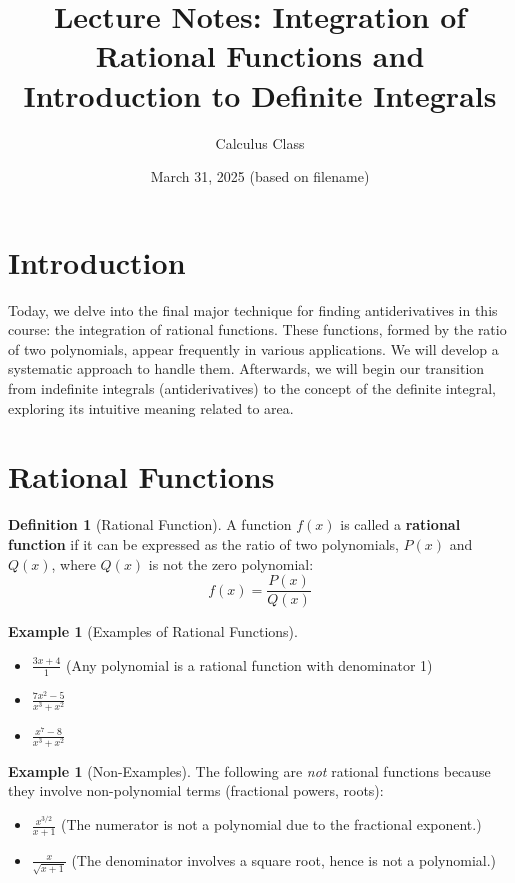 \documentclass[11pt]{article}
\title{Lecture Notes: Integration of Rational Functions and Introduction to Definite Integrals}
\author{Calculus Class}
\date{March 31, 2025 (based on filename)}
\theoremstyle{plain}
\theoremstyle{definition}
\newtheorem{definition}[theorem]{Definition}
\newtheorem{example}[theorem]{Example}
\theoremstyle{remark}
\begin{document}
\maketitle


\section{Introduction}

Today, we delve into the final major technique for finding antiderivatives in this course: the integration of rational functions. These functions, formed by the ratio of two polynomials, appear frequently in various applications. We will develop a systematic approach to handle them. Afterwards, we will begin our transition from indefinite integrals (antiderivatives) to the concept of the definite integral, exploring its intuitive meaning related to area.

\section{Rational Functions}

\begin{definition}[Rational Function]
A function $f(x)$ is called a \textbf{rational function} if it can be expressed as the ratio of two polynomials, $P(x)$ and $Q(x)$, where $Q(x)$ is not the zero polynomial:
\[ f(x) = \frac{P(x)}{Q(x)} \]
\end{definition}

\begin{example}[Examples of Rational Functions]
\begin{itemize}
    \item $\frac{3x + 4}{1}$ (Any polynomial is a rational function with denominator 1)
    \item $\frac{7x^2 - 5}{x^3 + x^2}$
    \item $\frac{x^7 - 8}{x^3 + x^2}$
\end{itemize}
\end{example}

\begin{example}[Non-Examples]
The following are \emph{not} rational functions because they involve non-polynomial terms (fractional powers, roots):
\begin{itemize}
    \item $\frac{x^{3/2}}{x+1}$ (The numerator is not a polynomial due to the fractional exponent.)
    \item $\frac{x}{\sqrt{x+1}}$ (The denominator involves a square root, hence is not a polynomial.)
\end{itemize}
\end{example}
\end{document}

